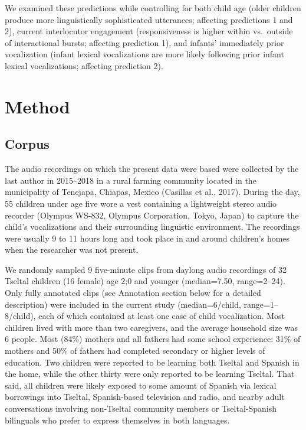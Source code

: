 \documentclass[
  man]{apa6}
\begin{document}
We examined these predictions while controlling for both child age (older children produce more linguistically sophisticated utterances; affecting predictions 1 and 2), current interlocutor engagement (responsiveness is higher within vs.~outside of interactional bursts; affecting prediction 1), and infants' immediately prior vocalization (infant lexical vocalizations are more likely following prior infant lexical vocalizations; affecting prediction 2).

\hypertarget{method}{%
\section{Method}\label{method}}

\hypertarget{corpus}{%
\subsection{Corpus}\label{corpus}}

The audio recordings on which the present data were based were collected by the last author in 2015--2018 in a rural farming community located in the municipality of Tenejapa, Chiapas, Mexico (Casillas et al., 2017). During the day, 55 children under age five wore a vest containing a lightweight stereo audio recorder (Olympus WS-832, Olympus Corporation, Tokyo, Japan) to capture the child's vocalizations and their surrounding linguistic environment. The recordings were usually 9 to 11 hours long and took place in and around children's homes when the researcher was not present.

We randomly sampled 9 five-minute clips from daylong audio recordings of 32 Tseltal children (16 female) age 2;0 and younger (median=7.50, range=2--24). Only fully annotated clips (see Annotation section below for a detailed description) were included in the current study (median=6/child, range=1--8/child), each of which contained at least one case of child vocalization. Most children lived with more than two caregivers, and the average household size was 6 people. Most (84\%) mothers and all fathers had some school experience: 31\% of mothers and 50\% of fathers had completed secondary or higher levels of education. Two children were reported to be learning both Tseltal and Spanish in the home, while the other thirty were only reported to be learning Tseltal. That said, all children were likely exposed to some amount of Spanish via lexical borrowings into Tseltal, Spanish-based television and radio, and nearby adult conversations involving non-Tseltal community members or Tseltal-Spanish bilinguals who prefer to express themselves in both languages.
\end{document}
